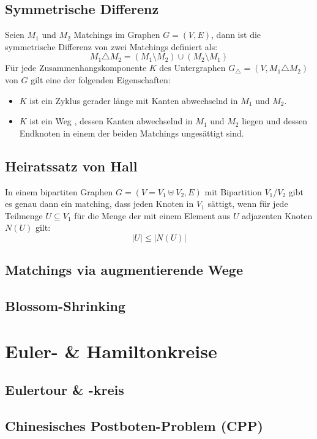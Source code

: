 \documentclass[10pt,a4paper,landscape]{article}
\begin{document}
\begin{multicols*}{2}
    \subsection*{ Symmetrische Differenz }
    Seien $M_1$ und $M_2$ Matchings im Graphen $G = (V,E)$, dann ist die symmetrische Differenz von zwei Matchings definiert als:
    \[ M_1 \triangle M_2 = (M_1 \setminus M_2) \cup (M_2 \setminus M_1) \]
    Für jede Zusammenhangskomponente $K$ des Untergraphen $G_{\triangle} = (V,M_1 \triangle M_2)$ von $G$ gilt eine der folgenden 
    Eigenschaften:
    \begin{itemize}
        \item $K$ ist ein Zyklus gerader länge mit Kanten abwechselnd in $M_1$ und $M_2$.
        \item $K$ ist ein Weg , dessen Kanten abwechselnd in $M_1$ und $M_2$ liegen und dessen Endknoten in einem der beiden Matchings ungesättigt sind.
    \end{itemize}
    \subsection*{ Heiratssatz von Hall }
    In einem bipartiten Graphen $G = (V = V_1 \uplus V_2, E)$ mit Bipartition $V_1$/$V_2$ gibt es genau dann ein matching, dass jeden Knoten in $V_1$ sättigt, 
    wenn für jede Teilmenge $U \subseteq V_1$ für die Menge der mit einem Element aus $U$ adjazenten Knoten $N(U)$ gilt:
    \[ |U| \leq |N(U)| \]

    \subsection{ Matchings via augmentierende Wege }

    \subsection{ Blossom-Shrinking }


\section{ Euler- \& Hamiltonkreise }
    \subsection{ Eulertour \& -kreis}

    \subsection{ Chinesisches Postboten-Problem (CPP) }


\end{multicols*}
\end{document}
